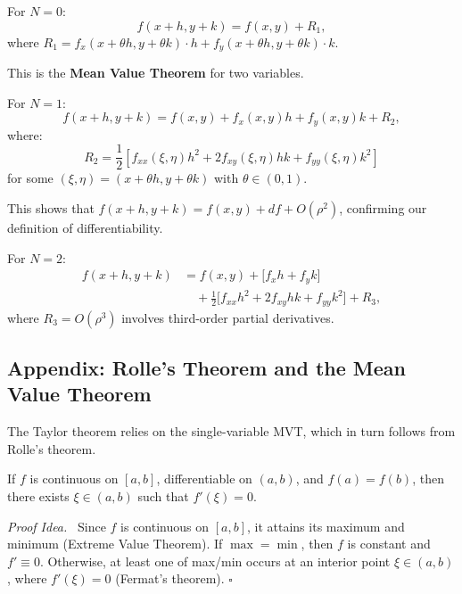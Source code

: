 \documentclass[11pt]{report}
\renewenvironment{proof}[1][Proof]{\par\noindent\textit{#1.}\ }{\hfill$\square$\par\medskip}
\begin{document}
\begin{example}
For $N = 0$:
\[
f(x + h, y + k) = f(x, y) + R_1,
\]
where $R_1 = f_x(x + \theta h, y + \theta k) \cdot h + f_y(x + \theta h, y + \theta k) \cdot k$.

This is the \textbf{Mean Value Theorem} for two variables.
\end{example}

\begin{example}
For $N = 1$:
\[
f(x + h, y + k) = f(x, y) + f_x(x, y) h + f_y(x, y) k + R_2,
\]
where:
\[
R_2 = \frac{1}{2} \left[ f_{xx}(\xi, \eta) h^2 + 2f_{xy}(\xi, \eta) hk + f_{yy}(\xi, \eta) k^2 \right]
\]
for some $(\xi, \eta) = (x + \theta h, y + \theta k)$ with $\theta \in (0, 1)$.

This shows that $f(x+h, y+k) = f(x,y) + df + O(\rho^2)$, confirming our definition of differentiability.
\end{example}

\begin{example}
For $N = 2$:
\begin{align*}
f(x + h, y + k) &= f(x, y) + \bigl[ f_x h + f_y k \bigr] \\
&\quad + \frac{1}{2} \bigl[ f_{xx} h^2 + 2f_{xy} hk + f_{yy} k^2 \bigr] + R_3,
\end{align*}
where $R_3 = O(\rho^3)$ involves third-order partial derivatives.
\end{example}

\subsection{Appendix: Rolle's Theorem and the Mean Value Theorem}

The Taylor theorem relies on the single-variable MVT, which in turn follows from Rolle's theorem.

\begin{theorem}
If $f$ is continuous on $[a, b]$, differentiable on $(a, b)$, and $f(a) = f(b)$, then there exists $\xi \in (a, b)$ such that $f'(\xi) = 0$.
\end{theorem}

\begin{proof}[Proof Idea]
Since $f$ is continuous on $[a, b]$, it attains its maximum and minimum (Extreme Value Theorem). If $\max = \min$, then $f$ is constant and $f' \equiv 0$. Otherwise, at least one of max/min occurs at an interior point $\xi \in (a, b)$, where $f'(\xi) = 0$ (Fermat's theorem).
\end{proof}
\end{document}
